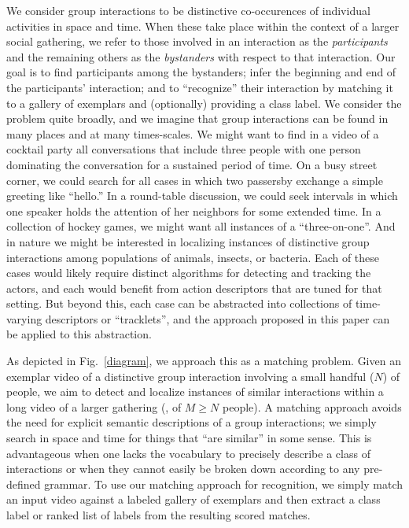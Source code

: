 We consider group interactions to be distinctive co-occurences of individual activities in space and time. When these take place within the context of a larger social gathering, we refer to those involved in an interaction as the \emph{participants} and the remaining others as the \emph{bystanders} with respect to that interaction. Our goal is to find participants among the bystanders; infer the beginning and end of the participants' interaction; and to ``recognize'' their interaction by matching it to a gallery of exemplars and (optionally) providing a class label. We consider the problem quite broadly, and we imagine that group interactions can be found in many places and at many times-scales. We might want to find in a video of a cocktail party all conversations that include three people with one person dominating the conversation for a sustained period of time. On a busy street corner, we could search for all cases in which two passersby exchange a simple greeting like ``hello.'' In a round-table discussion, we could seek intervals in which one speaker holds the attention of her neighbors for some extended time. In a collection of hockey games, we might want all instances of a ``three-on-one''. And in nature we might be interested in localizing instances of distinctive group interactions among populations of animals, insects, or bacteria. Each of these cases would likely require distinct algorithms for detecting and tracking the actors, and each would benefit from action descriptors that are tuned for that setting. But beyond this, each case can be abstracted into collections of time-varying descriptors or ``tracklets'', and the approach proposed in this paper can be applied to this abstraction.
 
As depicted in Fig.~\ref{diagram}, we approach this as a matching problem. Given an exemplar video of a distinctive group interaction involving a small handful ($N$) of people, we aim to detect and localize instances of similar interactions within a long video of a larger gathering (\ie, of $M\ge N$ people). A matching approach avoids the need for explicit semantic descriptions of a group interactions; we simply search in space and time for things that ``are similar'' in some sense. This is advantageous when one lacks the vocabulary to precisely describe a class of interactions or when they cannot easily be broken down according to any pre-defined grammar. To use our matching approach for recognition, we simply match an input video against a labeled gallery of exemplars and then extract a class label or ranked list of labels from the resulting scored matches.

